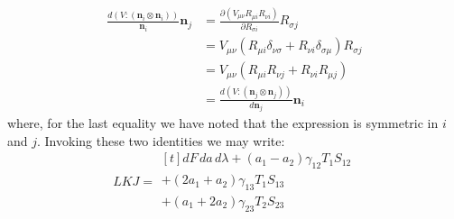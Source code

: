 \documentclass[reqno]{article}
\begin{document}
\begin{equation}
    \begin{split}
    \frac{d \left(V : \left(\mathbf{n}_i \otimes \mathbf{n}_i\right) \right)}{\mathbf{n}_i} \mathbf{n}_j
    &=
    \frac{\partial \left(V_{\mu\nu} R_{\mu i} R_{\nu i}\right)}{\partial R_{\sigma i}} R_{\sigma j} \\
    &=
    V_{\mu\nu} \left(R_{\mu i} \delta_{\nu\sigma} + R_{\nu i} \delta_{\sigma \mu} \right) R_{\sigma j} \\
    &=
    V_{\mu\nu} \left(R_{\mu i} R_{\nu j} + R_{\nu i} R_{\mu j} \right) \\
    &=
    \frac{d \left( V : \left(\mathbf{n}_j \otimes \mathbf{n}_j \right) \right)}{d \mathbf{n}_j} \mathbf{n}_i
    \end{split}
\end{equation}
where, for the last equality we have noted that the expression is symmetric in $i$ and $j$.
Invoking these two identities we may write:
\begin{equation}
    LKJ
    =
    \begin{multlined}[t]
    dF \, da \, d\lambda
    + (a_1 - a_2) \gamma_{12} T_1 S_{12} \\
    + (2 a_1 + a_2) \gamma_{13} T_1 S_{13} \\
    + (a_1 + 2 a_2) \gamma_{23} T_2 S_{23} 
    \end{multlined}
\end{equation}
\end{document}
